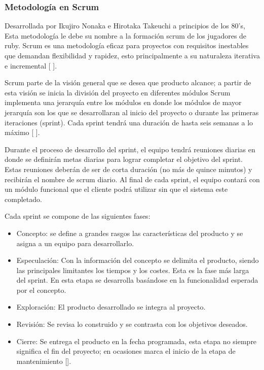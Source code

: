 \subsubsection{Metodología en Scrum}
Desarrollada por Ikujiro Nonaka e Hirotaka Takeuchi a principios de los 80’s, Esta metodología le debe su nombre a la formación scrum de los jugadores de ruby. Scrum es una metodología eficaz para proyectos con requisitos inestables que demandan flexibilidad y rapidez, esto principalmente a su naturaleza iterativa e incremental [ ].  
\\
\par
Scrum parte de la visión general que se desea que producto alcance; a partir de esta visión se inicia la división del proyecto en diferentes módulos Scrum implementa una jerarquía entre los módulos en donde los módulos de mayor jerarquía son los que se desarrollaran al inicio del proyecto o durante las primeras iteraciones (sprint). Cada sprint tendrá una duración de hasta seis semanas a lo máximo [ ]. 
\\
\par
Durante el proceso de desarrollo del sprint, el equipo tendrá reuniones diarias en donde se definirán metas diarias para lograr completar el objetivo del sprint. Estas reuniones deberán de ser de corta duración (no más de quince minutos) y recibirán el nombre de scrum diario. Al final de cada sprint, el equipo contará con un módulo funcional que el cliente podrá utilizar sin que el sistema este completado.
\\
\par
Cada sprint se compone de las siguientes fases:
\begin{itemize}
	\item Concepto: se define a grandes rasgos las características del producto y se asigna a un equipo para desarrollarlo.
	\item Especulación: Con la información del concepto se delimita el producto, siendo las principales limitantes los tiempos y los costes. Esta es la fase más larga del sprint. En esta etapa se desarrolla basándose en la funcionalidad esperada por el concepto.
	\item Exploración: El producto desarrollado se integra al proyecto.
	\item Revisión: Se revisa lo construido y se contrasta con los objetivos deseados.
	\item Cierre: Se entrega el producto en la fecha programada, esta etapa no siempre significa el fin del proyecto; en ocasiones marca el inicio de la etapa de mantenimiento []. 
\end{itemize}
